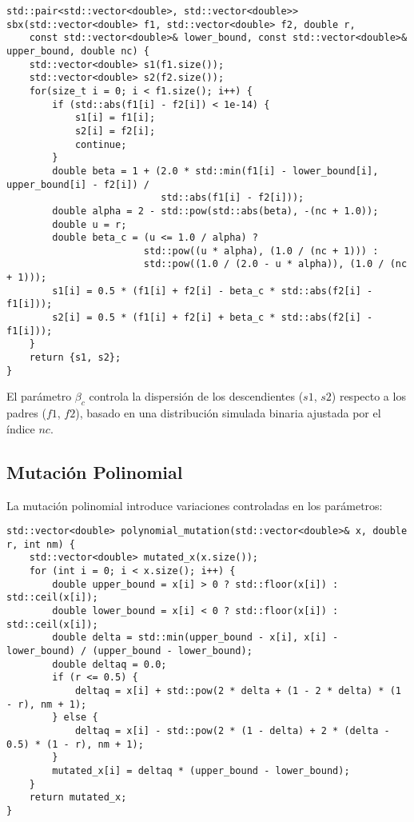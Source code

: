 \begin{lstlisting}[style=cppstyle, caption={Cruce SBX}, label={lst:sbx}]
std::pair<std::vector<double>, std::vector<double>> sbx(std::vector<double> f1, std::vector<double> f2, double r,
    const std::vector<double>& lower_bound, const std::vector<double>& upper_bound, double nc) {
    std::vector<double> s1(f1.size());
    std::vector<double> s2(f2.size());
    for(size_t i = 0; i < f1.size(); i++) {
        if (std::abs(f1[i] - f2[i]) < 1e-14) {
            s1[i] = f1[i];
            s2[i] = f2[i];
            continue;
        }
        double beta = 1 + (2.0 * std::min(f1[i] - lower_bound[i], upper_bound[i] - f2[i]) /
                           std::abs(f1[i] - f2[i]));
        double alpha = 2 - std::pow(std::abs(beta), -(nc + 1.0));
        double u = r;
        double beta_c = (u <= 1.0 / alpha) ?
                        std::pow((u * alpha), (1.0 / (nc + 1))) :
                        std::pow((1.0 / (2.0 - u * alpha)), (1.0 / (nc + 1)));
        s1[i] = 0.5 * (f1[i] + f2[i] - beta_c * std::abs(f2[i] - f1[i]));
        s2[i] = 0.5 * (f1[i] + f2[i] + beta_c * std::abs(f2[i] - f1[i]));
    }
    return {s1, s2};
}
\end{lstlisting}

El parámetro \(\beta_c\) controla la dispersión de los descendientes (\(s1\), \(s2\)) respecto a los padres (\(f1\), \(f2\)), basado en una distribución simulada binaria ajustada por el índice \(nc\).

\subsection{Mutación Polinomial}
\label{subsec:mutacion_polinomial}

La mutación polinomial introduce variaciones controladas en los parámetros:

\begin{lstlisting}[style=cppstyle, caption={Mutación polinomial}, label={lst:poly_mut}]
std::vector<double> polynomial_mutation(std::vector<double>& x, double r, int nm) {
    std::vector<double> mutated_x(x.size());
    for (int i = 0; i < x.size(); i++) {
        double upper_bound = x[i] > 0 ? std::floor(x[i]) : std::ceil(x[i]);
        double lower_bound = x[i] < 0 ? std::floor(x[i]) : std::ceil(x[i]);
        double delta = std::min(upper_bound - x[i], x[i] - lower_bound) / (upper_bound - lower_bound);
        double deltaq = 0.0;
        if (r <= 0.5) {
            deltaq = x[i] + std::pow(2 * delta + (1 - 2 * delta) * (1 - r), nm + 1);
        } else {
            deltaq = x[i] - std::pow(2 * (1 - delta) + 2 * (delta - 0.5) * (1 - r), nm + 1);
        }
        mutated_x[i] = deltaq * (upper_bound - lower_bound);
    }
    return mutated_x;
}
\end{lstlisting}

